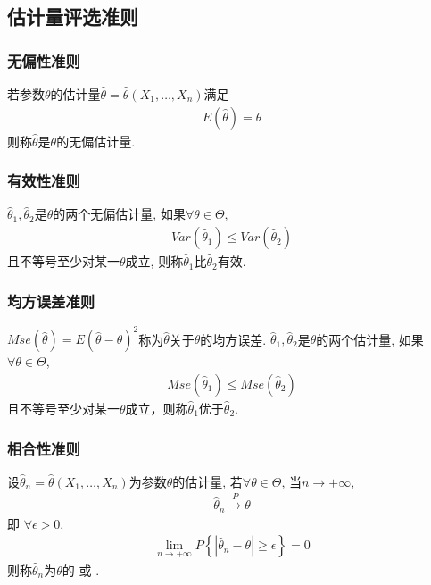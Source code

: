 \subsection{估计量评选准则}
\subsubsection{无偏性准则}
\begin{definition}
    若参数$\theta$的估计量$\hat{\theta}=\hat{\theta}(X_1,\dots,X_n)$满足
    \begin{align*}
        E(\hat{\theta})=\theta
    \end{align*}
    则称$\hat{\theta}$是$\theta$的无偏估计量. 
\end{definition}
\subsubsection{有效性准则}
\begin{definition}
    $\hat{\theta}_1, \hat{\theta}_2$是$\theta$的两个无偏估计量, 如果$\forall \theta\in \Theta$,
    \begin{align*}
        Var(\hat{\theta}_1)\le Var(\hat{\theta}_2)
    \end{align*}
    且不等号至少对某一$\theta$成立, 则称$\hat{\theta}_1$比$\hat{\theta}_2$有效.
\end{definition}
\subsubsection{均方误差准则}
\begin{definition}
    $Mse(\hat{\theta})=E\left(\hat{\theta}-\theta\right)^2$称为$\hat{\theta}$关于$\theta$的均方误差. $\hat{\theta}_1, \hat{\theta}_2$是$\theta$的两个估计量, 如果$\forall \theta\in \Theta$,
    \begin{align*}
        Mse(\hat{\theta}_1)\le Mse(\hat{\theta}_2) 
    \end{align*}
    且不等号至少对某一$\theta$成立，则称$\hat{\theta}_1$优于$\hat{\theta}_2$. 
\end{definition}
\subsubsection{相合性准则}
\begin{definition}
    设$\hat{\theta}_n=\hat{\theta}(X_1,\dots,X_n)$为参数$\theta$的估计量, 若$\forall \theta\in\Theta$, 当$n\rightarrow +\infty$, 
    \begin{align*}
        \hat{\theta}_n\overset{P}{\longrightarrow}\theta
    \end{align*}
    即 $\forall \epsilon>0$,
    \begin{align*}
        \lim_{n\rightarrow +\infty}P\left\{\left|\hat{\theta}_n-\theta\right|\ge \epsilon \right\}=0
    \end{align*}
    则称$\hat{\theta}_n$为$\theta$的  或 . 
\end{definition}


